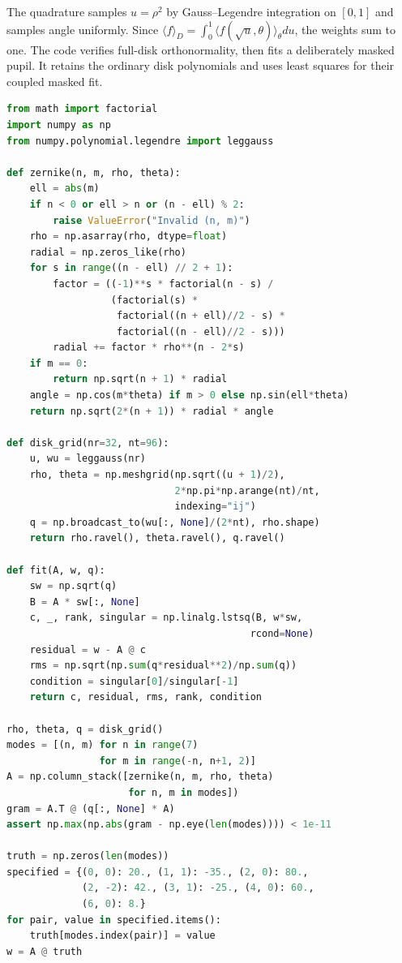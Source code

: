 The quadrature samples $u=\rho^2$ by Gauss--Legendre integration on
$[0,1]$ and samples angle uniformly. Since
$\langle f\rangle_D=\int_0^1\langle f(\sqrt u,\theta)\rangle_\theta du$,
the weights sum to one. The code verifies full-disk orthonormality,
then fits a deliberately masked pupil. It retains the ordinary disk
polynomials and uses least squares for their coupled masked fit.

\begin{lstlisting}[language=Python,caption={A self-contained Zernike fitting experiment.}]
from math import factorial
import numpy as np
from numpy.polynomial.legendre import leggauss

def zernike(n, m, rho, theta):
    ell = abs(m)
    if n < 0 or ell > n or (n - ell) % 2:
        raise ValueError("Invalid (n, m)")
    rho = np.asarray(rho, dtype=float)
    radial = np.zeros_like(rho)
    for s in range((n - ell) // 2 + 1):
        factor = ((-1)**s * factorial(n - s) /
                  (factorial(s) *
                   factorial((n + ell)//2 - s) *
                   factorial((n - ell)//2 - s)))
        radial += factor * rho**(n - 2*s)
    if m == 0:
        return np.sqrt(n + 1) * radial
    angle = np.cos(m*theta) if m > 0 else np.sin(ell*theta)
    return np.sqrt(2*(n + 1)) * radial * angle

def disk_grid(nr=32, nt=96):
    u, wu = leggauss(nr)
    rho, theta = np.meshgrid(np.sqrt((u + 1)/2),
                             2*np.pi*np.arange(nt)/nt,
                             indexing="ij")
    q = np.broadcast_to(wu[:, None]/(2*nt), rho.shape)
    return rho.ravel(), theta.ravel(), q.ravel()

def fit(A, w, q):
    sw = np.sqrt(q)
    B = A * sw[:, None]
    c, _, rank, singular = np.linalg.lstsq(B, w*sw,
                                          rcond=None)
    residual = w - A @ c
    rms = np.sqrt(np.sum(q*residual**2)/np.sum(q))
    condition = singular[0]/singular[-1]
    return c, residual, rms, rank, condition

rho, theta, q = disk_grid()
modes = [(n, m) for n in range(7)
                for m in range(-n, n+1, 2)]
A = np.column_stack([zernike(n, m, rho, theta)
                     for n, m in modes])
gram = A.T @ (q[:, None] * A)
assert np.max(np.abs(gram - np.eye(len(modes)))) < 1e-11

truth = np.zeros(len(modes))
specified = {(0, 0): 20., (1, 1): -35., (2, 0): 80.,
             (2, -2): 42., (3, 1): -25., (4, 0): 60.,
             (6, 0): 8.}
for pair, value in specified.items():
    truth[modes.index(pair)] = value
w = A @ truth


\end{lstlisting}
